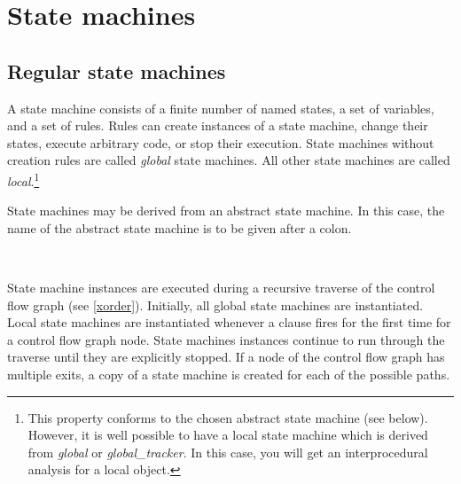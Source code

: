 \chapter{State machines}\label{sm}

\section{Regular state machines}

A state machine consists of a finite number of named states, a set of
variables, and a set of rules. Rules can create instances of a state machine,
change their states, execute arbitrary code, or stop their execution.
State machines without creation rules are called \textit{global}
state machines. All other state machines are
called \textit{local}.\footnote{This property
conforms to the chosen abstract state machine (see below). However,
it is well possible to have a local state machine which is derived from
\textit{global} or \textit{global\_tracker}. In this case, you will get
an interprocedural analysis for a local object.}

State machines may be derived from an abstract state machine. In this
case, the name of the abstract state machine is to be given after a
colon.

\begin{grammar}
      \produces {}  
	 \lextoken{(}
	  \lextoken{)} \nextline
	 \lextoken{\{}  
	 \lextoken{\}} \\
      \produces {} 
	  \lextoken{:} 
	 \lextoken{(}  \lextoken{)} \nextline
	 \lextoken{\{}  
	 \lextoken{\}}
\end{grammar}%

\noindent
State machine instances are executed during a recursive traverse
of the control flow graph (see \ref{xorder}). Initially, all global
state machines
are instantiated. Local state machines are instantiated whenever a
 clause fires for the first time for a control flow graph
node. State machines instances continue to run through the traverse
until they are explicitly stopped. If a node of the control flow graph
has multiple exits, a copy of a state machine is created for each of
the possible paths.

